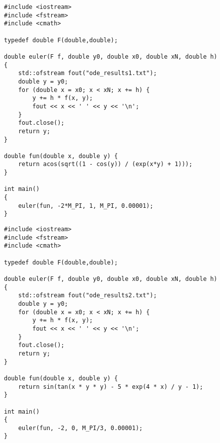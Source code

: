 \def \equationFirst {\sin^2{y'} - \cos{y} = e^{xy} \cdot \cos^2{y'}}
\def \conditionFirst { y(1) = -2\pi }
\def \toFindFirst { y(\pi) }

\def \equationSecond {\tan{(xy^2)} - \dfrac{5e^{4x}}{y} = \arcsin{y'} + 1}
\def \conditionSecond { y(0) = -2 }
\def \toFindSecond { y\left(\dfrac{\pi}{3}\right) }



\begin{scontents}
\begin{lstlisting}
#include <iostream>
#include <fstream>
#include <cmath> 

typedef double F(double,double);

double euler(F f, double y0, double x0, double xN, double h)
{
	std::ofstream fout("ode_results1.txt"); 
	double y = y0;
	for (double x = x0; x < xN; x += h) {
		y += h * f(x, y);
		fout << x << ' ' << y << '\n';
	}
	fout.close();
	return y;
}

double fun(double x, double y) {
	return acos(sqrt((1 - cos(y)) / (exp(x*y) + 1)));
}

int main()
{
	euler(fun, -2*M_PI, 1, M_PI, 0.00001);			  
}

\end{lstlisting}
\end{scontents}

\begin{scontents}
\begin{lstlisting}
#include <iostream>
#include <fstream>
#include <cmath> 

typedef double F(double,double);

double euler(F f, double y0, double x0, double xN, double h)
{
	std::ofstream fout("ode_results2.txt"); 
	double y = y0;
	for (double x = x0; x < xN; x += h) {
		y += h * f(x, y);
		fout << x << ' ' << y << '\n';
	}
	fout.close();
	return y;
}

double fun(double x, double y) {
	return sin(tan(x * y * y) - 5 * exp(4 * x) / y - 1);
}

int main()
{
	euler(fun, -2, 0, M_PI/3, 0.00001);
}

\end{lstlisting}
\end{scontents}

\newcommand{\solutionItemSecond}[5]{
	\item
	    \customCases{#2}{#3}
	    
	    
	    \vspace{1em}
	    \textit{Решим численно:} $ #4 \approx #5 $
	    
 	    \vspace{1em}
	    \textit{График:}
	    \begin{figure}[h]
	    	\centering
	    	\texttt{[image: img/euler\#1.pdf]}
	    \end{figure}
    
    	\clearpage
    	\textit{Код:}
    		\getstored[#1]{contents}
}

